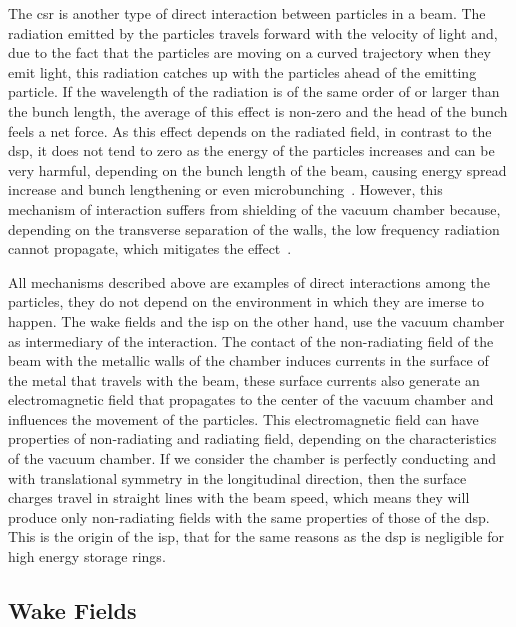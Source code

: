     The \gls{csr} is another type of direct interaction between particles in a beam. The radiation emitted by the particles travels forward with the velocity of light and, due to the fact that the particles are moving on a curved trajectory when they emit light, this radiation catches up with the particles ahead of the emitting particle. If the wavelength of the radiation is of the same order of or larger than the bunch length, the average of this effect is non-zero and the head of the bunch feels a net force. As this effect depends on the radiated field, in contrast to the \gls{dsp}, it does not tend to zero as the energy of the particles increases and can be very harmful, depending on the bunch length of the beam, causing energy spread increase and bunch lengthening or even microbunching~\cite{csr_instability}. However, this mechanism of interaction suffers from shielding of the vacuum chamber because, depending on the transverse separation of the walls, the low frequency radiation cannot propagate, which mitigates the effect~\cite{csr_shielding}.

    All mechanisms described above are examples of direct interactions among the particles, they do not depend on the environment in which they are imerse to happen. The wake fields and the \gls{isp} on the other hand, use the vacuum chamber as intermediary of the interaction. The contact of the non-radiating field of the beam with the metallic walls of the chamber induces currents in the surface of the metal that travels with the beam, these surface currents also generate an electromagnetic field that propagates to the center of the vacuum chamber and influences the movement of the particles. This electromagnetic field can have properties of non-radiating and radiating field, depending on the characteristics of the vacuum chamber. If we consider the chamber is perfectly conducting and with translational symmetry in the longitudinal direction, then the surface charges travel in straight lines with the beam speed, which means they will produce only non-radiating fields with the same properties of those of the \gls{dsp}. This is the origin of the \gls{isp}, that for the same reasons as the \gls{dsp} is negligible for high energy storage rings.

\subsection{Wake Fields}\label{ssec:wake_fields}

